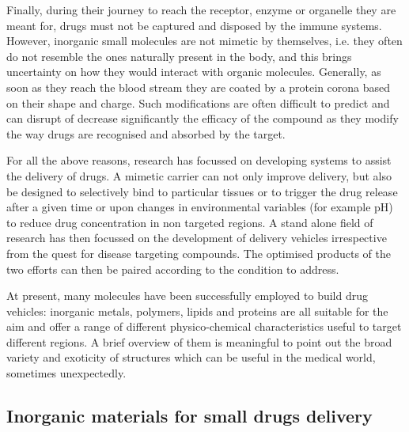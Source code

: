 \documentclass[a4paper,11pt]{extreport}
\begin{document}
Finally, during their journey to reach the receptor, enzyme or organelle they are meant for, drugs must not be captured and disposed by the immune systems. However, inorganic small molecules are not mimetic by themselves, i.e. they often do not resemble the ones naturally present in the body, and this brings uncertainty on how they would interact with organic molecules. Generally, as soon as they reach the blood stream they are coated by a protein corona based on their shape and charge.\cite{Krol2012} Such modifications are often difficult to predict and can disrupt of decrease significantly the efficacy of the compound as they modify the way drugs are recognised and absorbed by the target. 

For all the above reasons, research has focussed on developing systems to assist the delivery of drugs.\cite{Jain2016, Pattni2015, Mitragotri2014} A mimetic carrier can not only improve delivery, but also be designed to selectively bind to particular tissues or to trigger the drug release after a given time or upon changes in environmental variables (for example pH) to reduce drug concentration in non targeted regions. A stand alone field of research has then focussed on the development of delivery vehicles irrespective from the quest for disease targeting compounds. The optimised products of the two efforts can then be paired according to the condition to address.

At present, many molecules have been successfully employed to build drug vehicles: inorganic metals, polymers, lipids and proteins are all suitable for the aim and offer a range of different physico-chemical characteristics useful to target different regions.\cite{Hughes2005} A brief overview of them is meaningful to point out the broad variety and exoticity of structures which can be useful in the medical world, sometimes unexpectedly.


\subsection{Inorganic materials for small drugs delivery}
\end{document}
